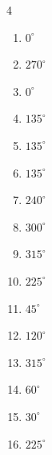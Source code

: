 \begin{multicols}{4}
\begin{enumerate}
  \item $\displaystyle 0^{\circ}$
        \phantom{$\displaystyle =0$}

  \item $\displaystyle 270^{\circ}$

  \item $\displaystyle 0^{\circ}$
        \phantom{$\displaystyle =0$}

  \item $\displaystyle 135^{\circ}$

  \item $\displaystyle 135^{\circ}$

  \item $\displaystyle 135^{\circ}$

  \item $\displaystyle 240^{\circ}$

  \item $\displaystyle 300^{\circ}$

  \item $\displaystyle 315^{\circ}$

  \item $\displaystyle 225^{\circ}$

  \item $\displaystyle 45^{\circ}$

  \item $\displaystyle 120^{\circ}$

  \item $\displaystyle 315^{\circ}$

  \item $\displaystyle 60^{\circ}$

  \item $\displaystyle 30^{\circ}$

  \item $\displaystyle 225^{\circ}$


\end{enumerate}
\end{multicols}
